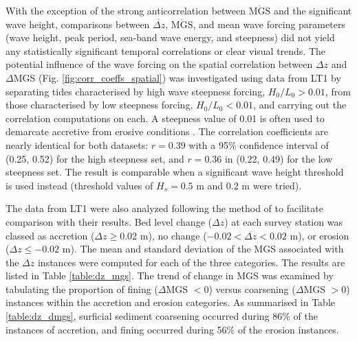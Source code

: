 \documentclass[preprint,12pt,authoryear]{elsarticle}
\begin{document}
With the exception of the strong anticorrelation between $\overline{\mathrm{MGS}}$ and the significant wave height, comparisons between $\overline{\Delta z}$, $\overline{\mathrm{MGS}}$, and mean wave forcing parameters (wave height, peak period, sea-band wave energy, and steepness) did not yield any statistically significant temporal correlations or clear visual trends. The potential influence of the wave forcing on the spatial correlation between $\Delta z$ and $\Delta$MGS (Fig. \ref{fig:corr_coeffs_spatial}) was investigated using data from LT1 by separating tides characterised by high wave steepness forcing, $H_0/L_0 > 0.01$, from those characterised by low steepness forcing, $H_0/L_0 < 0.01$, and carrying out the correlation computations on each. A steepness value of 0.01 is often used to demarcate accretive from erosive conditions \citep[e.g.,][]{Masselink_etal2007}. The correlation coefficients are nearly identical for both datasets: $r=0.39$ with a 95\% confidence interval of (0.25, 0.52) for the high steepness set, and $r=0.36$ in (0.22, 0.49) for the low steepness set. The result is comparable when a significant wave height threshold is used instead (threshold values of $H_{s} = 0.5$ m and $0.2$ m were tried).

The data from LT1 were also analyzed following the method of \citet{Masselink_etal2007} to facilitate comparison with their results. Bed level change ($\Delta z$) at each survey station was classed as accretion ($\Delta z \geq 0.02$ m), no change ($-0.02 < \Delta z < 0.02$ m), or erosion ($\Delta z \leq -0.02$ m). The mean and standard deviation of the MGS associated with the $\Delta z$ instances were computed for each of the three categories. The results are listed in Table \ref{table:dz_mgs}. The trend of change in MGS was examined by tabulating the proportion of fining ($\Delta$MGS $< 0$) versus coarsening ($\Delta$MGS $> 0$) instances within the accretion and erosion categories. As summarised in Table \ref{table:dz_dmgs}, surficial sediment coarsening occurred during 86\% of the instances of accretion, and fining occurred during 56\% of the erosion instances. %
\end{document}
